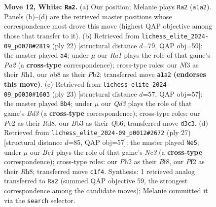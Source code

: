 \documentclass[11pt]{article}
\begin{document}
\begin{figure}[p]
\caption{\textbf{Move 12, White: \texttt{Ra2}.} (a) Our position; Melanie plays \texttt{Ra2} (\texttt{a1a2}). Panels (b)--(d) are the retrieved master positions whose correspondence most drove this move (highest QAP objective among those that transfer to it). (b) Retrieved from \texttt{lichess\_elite\_2024-09\_p0028\#2819} (ply 22) [structural distance $d$=79, QAP obj=59]: the master played \texttt{a4}; under $\mu$ our \emph{Ra1} plays the role of that game's \emph{Pa2} (a \textbf{cross-type} correspondence); cross-type roles: our \emph{N}f3 as their \emph{R}h1, our \emph{n}b8 as their \emph{P}b2; transferred move \texttt{a1a2} \textbf{(endorses this move)}. (c) Retrieved from \texttt{lichess\_elite\_2024-09\_p0030\#1603} (ply 23) [structural distance $d$=57, QAP obj=57]: the master played \texttt{Bb4}; under $\mu$ our \emph{Qd3} plays the role of that game's \emph{Bd3} (a \textbf{cross-type} correspondence); cross-type roles: our \emph{P}c2 as their \emph{R}d8, our \emph{B}b3 as their \emph{Q}b6; transferred move \texttt{d3c3}. (d) Retrieved from \texttt{lichess\_elite\_2024-09\_p0012\#2672} (ply 27) [structural distance $d$=85, QAP obj=57]: the master played \texttt{Ne5}; under $\mu$ our \emph{Bc1} plays the role of that game's \emph{Nc3} (a \textbf{cross-type} correspondence); cross-type roles: our \emph{P}h2 as their \emph{B}f8, our \emph{P}f2 as their \emph{R}h8; transferred move \texttt{c1f4}. Synthesis: 1 retrieved analog transferred to \texttt{Ra2} (summed QAP objective 59, the strongest correspondence among the candidate moves); Melanie committed it via the \texttt{search} selector.}
\label{fig:thought-m22}
\end{figure}

\clearpage
\end{document}
